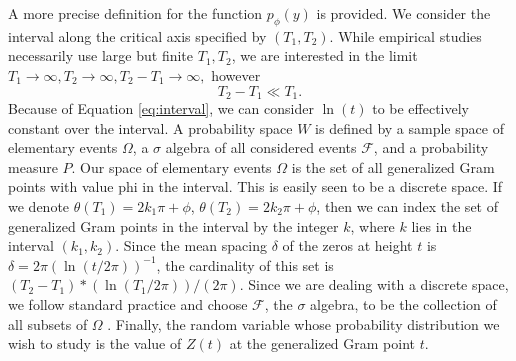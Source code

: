 \documentclass[twoside]{article}
\begin{document}
A more precise definition for the function $p_{\phi}(y)$ is provided. We consider the interval along 
the critical axis specified by $(T_1, T_2)$. While empirical studies necessarily use large but 
finite  $T_1, T_2$, we are interested in the limit 
$T_1 \rightarrow \infty, T_2 \rightarrow \infty,  T_2-T_1 \rightarrow \infty,$ however
\begin{equation}
T_2 - T_1  \ll T_1. 
\label{eq:interval}
\end{equation}
Because of Equation \ref{eq:interval}, we can consider  $\ln (t)$  to be effectively constant over  the interval. A probability space $W$ is defined by a sample space of elementary events $\Omega$, a $\sigma$ algebra of all considered events $\mathcal{F}$, and a probability measure $P$. Our space of elementary events $\Omega$ is the set of all generalized Gram points with value phi in the interval. This is easily seen to be a discrete space. If we denote $\theta (T_1) = 2k_1\pi + \phi$, $\theta (T_2) = 2k_2\pi + \phi$, then we can index the set of generalized Gram points in the interval by the integer  $k$, where $k$ lies in the interval $(k_1, k_2)$. Since the mean spacing $\delta$ of the zeros at height $t$ is $\delta = 2\pi(\ln (t/2\pi))^{-1}$, the cardinality of this set is $(T_2 - T_1)*(\ln (T_1/2\pi))/(2\pi)$. Since we are dealing with a discrete space, we follow standard practice and choose $\mathcal{F}$,  the  $\sigma$ algebra, to be the collection of all subsets of $\Omega$ . Finally, the random variable whose probability distribution we wish to study is the value of $Z(t)$ at the generalized Gram point $t$.
\end{document}
